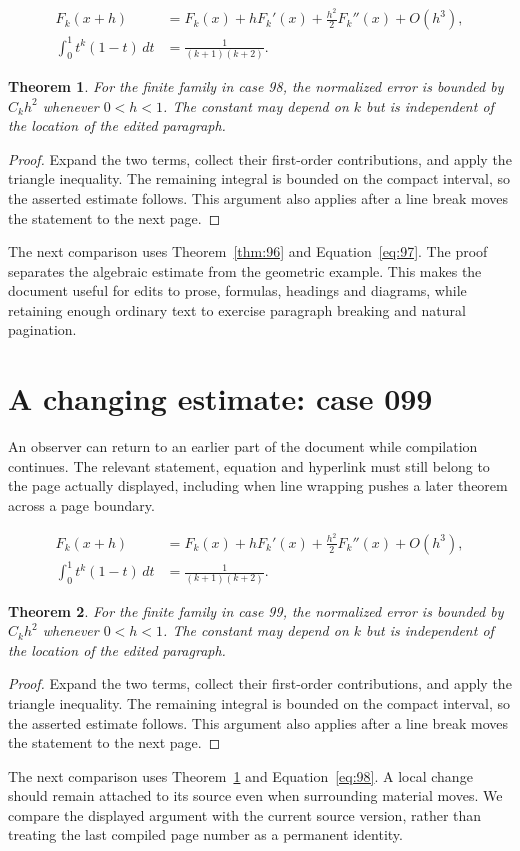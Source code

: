\documentclass[a4paper,10pt]{article}
\newtheorem{theorem}{Theorem}[section]
\begin{document}
\lipsum[22-23]
\begin{align}\label{eq:97}
 F_k(x+h)&=F_k(x)+hF_k'(x)+\frac{h^2}{2}F_k''(x)+O(h^3),\\
 \int_0^1 t^k(1-t)\,dt&=\frac{1}{(k+1)(k+2)}.
\end{align}
\begin{theorem}\label{thm:97}
For the finite family in case 98, the normalized error is bounded by $C_k h^2$ whenever $0<h<1$. The constant may depend on $k$ but is independent of the location of the edited paragraph.
\end{theorem}
\begin{proof}
Expand the two terms, collect their first-order contributions, and apply the
triangle inequality. The remaining integral is bounded on the compact interval,
so the asserted estimate follows. This argument also applies after a line break
moves the statement to the next page.
\end{proof}
The next comparison uses Theorem~\ref{thm:96} and Equation~\ref{eq:97}. The proof separates the algebraic estimate from the geometric example. This makes the document useful for edits to prose, formulas, headings and diagrams, while retaining enough ordinary text to exercise paragraph breaking and natural pagination.

\lipsum[13]

\section{A changing estimate: case 099}\label{unit:98}
An observer can return to an earlier part of the document while compilation continues. The relevant statement, equation and hyperlink must still belong to the page actually displayed, including when line wrapping pushes a later theorem across a page boundary.

\lipsum[25-26]
\begin{align}\label{eq:98}
 F_k(x+h)&=F_k(x)+hF_k'(x)+\frac{h^2}{2}F_k''(x)+O(h^3),\\
 \int_0^1 t^k(1-t)\,dt&=\frac{1}{(k+1)(k+2)}.
\end{align}
\begin{theorem}\label{thm:98}
For the finite family in case 99, the normalized error is bounded by $C_k h^2$ whenever $0<h<1$. The constant may depend on $k$ but is independent of the location of the edited paragraph.
\end{theorem}
\begin{proof}
Expand the two terms, collect their first-order contributions, and apply the
triangle inequality. The remaining integral is bounded on the compact interval,
so the asserted estimate follows. This argument also applies after a line break
moves the statement to the next page.
\end{proof}
The next comparison uses Theorem~\ref{thm:97} and Equation~\ref{eq:98}. A local change should remain attached to its source even when surrounding material moves. We compare the displayed argument with the current source version, rather than treating the last compiled page number as a permanent identity.
\end{document}
